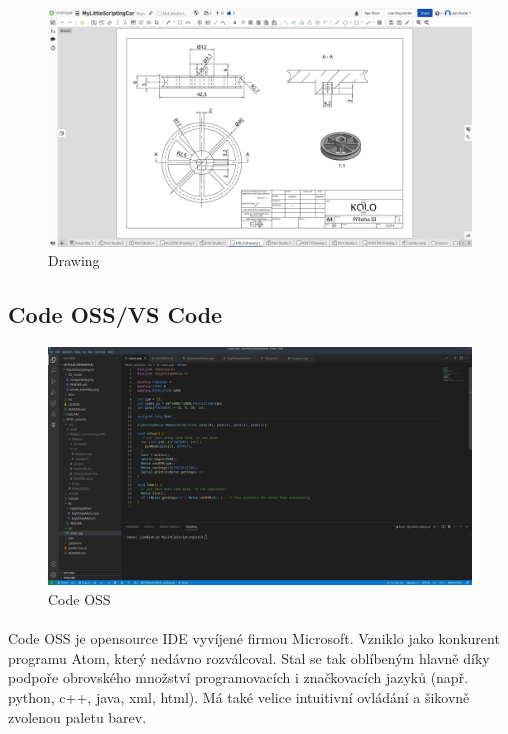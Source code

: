 \documentclass[12pt]{article}
\begin{document}
\begin{spacing}{1.5}
	\begin{figure}[H]
		\centering
		\includegraphics[width=\linewidth]{drawing_studio}
		\caption{Drawing}
		\label{fig:drawing_studio}
	\end{figure}
	
	\subsection{Code OSS/VS Code}
	
	\begin{figure}[H]
		\centering
		\includegraphics[width=\linewidth]{code_oss}
		\caption{Code OSS}
		\label{fig:code_oss}
	\end{figure}
	
	\paragraph{} Code OSS je opensource IDE vyvíjené firmou Microsoft. Vzniklo jako konkurent programu Atom, který nedávno rozválcoval. Stal se tak oblíbeným hlavně díky podpoře obrovského množství programovacích i značkovacích jazyků (např. python, c++, java, xml, html). Má také velice intuitivní ovládání a šikovně zvolenou paletu barev.
	

\end{spacing}
\end{document}
